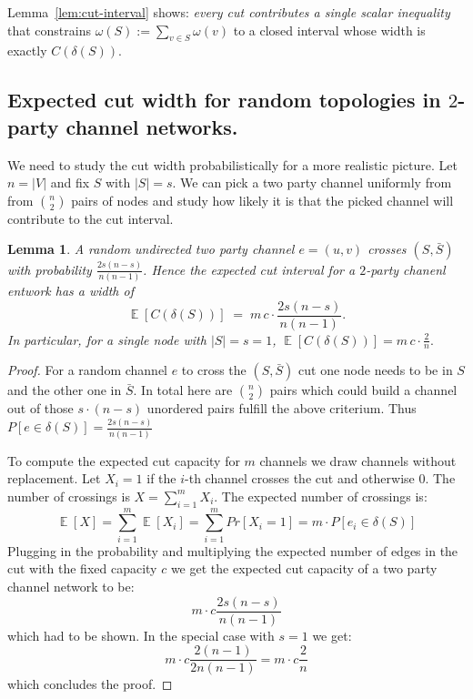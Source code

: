\documentclass[10pt,twocolumn]{article}
\newtheorem{lemma}[theorem]{Lemma}
\DeclareMathOperator{\EE}{\mathbb{E}}
\begin{document}
Lemma~\ref{lem:cut-interval} shows: \emph{every cut contributes a single scalar inequality} that constrains $\omega(S):=\sum_{v\in S}\omega(v)$ to a closed interval whose width is exactly $C(\delta(S))$.

\subsection{Expected cut width for random topologies in $2$-party channel networks.}
We need to study the cut width probabilistically for a more realistic picture.
Let $n=|V|$ and fix $S$ with $|S|=s$. We can pick a two party channel uniformly from from $\binom{n}{2}$ pairs of nodes and study how likely it is that the picked channel will contribute to the cut interval.

\begin{lemma}
\label{lem:2pc-exact}
A random undirected two party channel $e=(u,v)$ crosses $(S,\bar S)$ with probability $\frac{2s(n-s)}{n(n-1)}$. Hence the expected cut interval for a $2$-party chanenl entwork has a width of
\[
\EE[C(\delta(S))] \;=\; m\,c\cdot \frac{2s(n-s)}{n(n-1)}.
\]
In particular, for a single node with $|S| = s=1$,
\(
\EE[C(\delta(S))] = m\,c\cdot \frac{2}{n}.
\)
\end{lemma}

\begin{proof}
  For a random channel $e$ to cross the $(S,\bar S)$ cut one node needs to be in $S$ and the other one in $\bar S$.
  In total here are $\binom{n}{2}$ pairs which could build a channel out of those $s\cdot(n-s)$ unordered pairs fulfill the above criterium.
  Thus $P[e\in\delta(S)] = \frac{2s(n-s)}{n(n-1)}$

  To compute the expected cut capacity for $m$ channels we draw channels without replacement.
  Let $X_i=1$ if the $i$-th channel crosses the cut and otherwise $0$.
  The number of crossings is $X=\sum_{i=1}^m{X_i}$.
  The expected number of crossings is:
  \begin{equation}
    \EE[X] = \sum_{i=1}^m\EE[X_i] = \sum_{i=1}^mPr[X_i = 1] = m\cdot P[e_i\in\delta(S)] 
  \end{equation}
  Plugging in the probability and multiplying the expected number of edges in the cut with the fixed capacity $c$ we get the expected cut capacity of a two party channel network to be:
  \begin{equation}
m\cdot c\frac{2s(n-s)}{n(n-1)}
    \end{equation}
  which had to be shown. In the special case with $s=1$ we get:
  \begin{equation}
m\cdot c\frac{2(n-1)}{2n(n-1)} = m\cdot c\frac{2}{n}
    \end{equation}
  which concludes the proof.
\end{proof}
\end{document}
